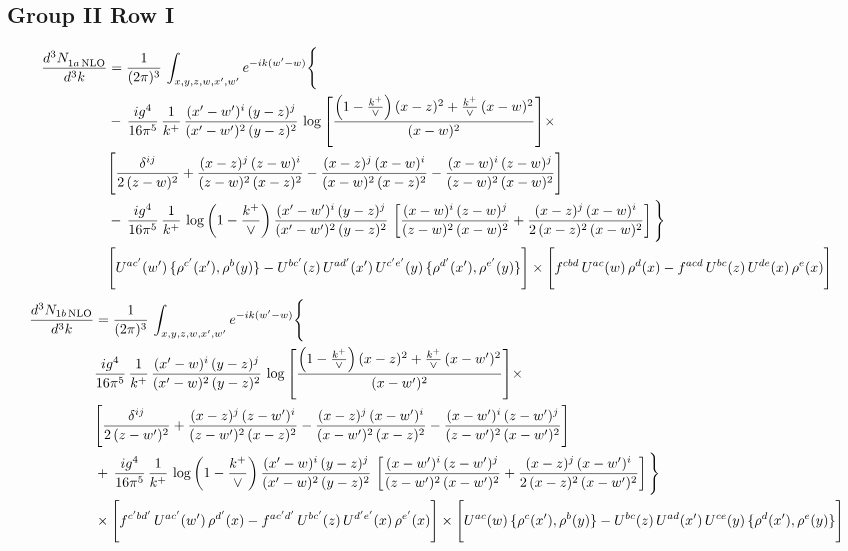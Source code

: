 \documentclass[10pt]{article}
\numberwithin{equation}{section}
\begin{document}
\subsection{Group II Row I}\label{sub:G2I}
\begin{align}
 \frac{d^{3}N_{1a\,\rm NLO}^{\rm}}{d^{3}k}  & =     \frac{1}{(2\pi)^{3}}\,\int_{x,y,z,w,x',w^{\prime}} e^{-ik(w^{\prime}-w)}\Bigg\{\notag \\
& -\, \frac{ig^{4}}{16\pi^{5}}\,\frac{1}{k^{+}}\, \frac{(x'-w')^{i}\,(y-z)^{j}}{(x'-w')^{2}\,(y-z)^{2}}\,\log{\left[\frac{\left(1-\frac{k^{+}}{\vee}\right)(x-z)^{2}+\frac{k^{+}}{\vee}\,(x-w)^{2}}{(x-w)^{2}}\right]}\times\notag \\ &  \Bigg[\frac{\delta^{ij}}{2\,(z-w)^{2}}+\frac{(x-z)^{j}\,(z-w)^{i}}{(z-w)^{2}\,(x-z)^{2}}-\frac{(x-z)^{j}\,(x-w)^{i}}{(x-w)^{2}\,(x-z)^{2}}-\frac{(x-w)^{i}\,(z-w)^{j}}{(z-w)^{2}\,(x-w)^{2}}\Bigg] \notag \\
& -\, \frac{ig^{4}}{16\pi^{5}}\,\frac{1}{k^{+}}\,\log{\left(1-\frac{k^{+}}{\vee}\right)}\,\frac{(x'-w')^{i}\,(y-z)^{j}}{(x'-w')^{2}\,(y-z)^{2}}\,\left[\frac{(x-w)^{i}\,(z-w)^{j}}{(z-w)^{2}\,(x-w)^{2}}+\frac{(x-z)^{j}\,(x-w)^{i}}{2\,(x-z)^{2}\, (x-w)^{2}}\right]\Bigg\} \notag \\ & \Bigg[U^{ac'}(w')\,\{\rho^{c'}(x'),\rho^{b}(y)\}-U^{bc'}(z)\,U^{ad'}(x')\,U^{c'e'}(y)\, \{\rho^{d'}(x'),\rho^{e'}(y)\}\Bigg]\times \Bigg[f^{cbd}\,U^{ac}(w)\,\rho^{d}(x)-f^{acd}\, U^{bc}(z)\,U^{de}(x)\,\rho^{e}(x)\Bigg]
\end{align}
\begin{align}
\frac{d^{3}N_{1b\, \rm NLO}}{d^{3}k} & =  \frac{1}{(2\pi)^{3}}\,\int_{x,y,z,w,x',w^{\prime}} e^{-ik(w^{\prime}-w)}\Bigg\{\notag \\
&  \frac{ig^{4}}{16\pi^{5}}\,\frac{1}{k^{+}}\, \frac{(x'-w)^{i}\,(y-z)^{j}}{(x'-w)^{2}\,(y-z)^{2}}\,\log{\left[\frac{\left(1-\frac{k^{+}}{\vee}\right)(x-z)^{2}+\frac{k^{+}}{\vee}\,(x-w')^{2}}{(x-w')^{2}}\right]}\times\notag \\ &  \Bigg[\frac{\delta^{ij}}{2\,(z-w')^{2}}+\frac{(x-z)^{j}\,(z-w')^{i}}{(z-w')^{2}\,(x-z)^{2}}-\frac{(x-z)^{j}\,(x-w')^{i}}{(x-w')^{2}\,(x-z)^{2}}-\frac{(x-w')^{i}\,(z-w')^{j}}{(z-w')^{2}\,(x-w')^{2}}\Bigg] \notag \\
& +\,\frac{ig^{4}}{16\pi^{5}}\,\frac{1}{k^{+}}\,\log{\left(1-\frac{k^{+}}{\vee}\right)}\,\frac{(x'-w)^{i}\,(y-z)^{j}}{(x'-w)^{2}\,(y-z)^{2}}\,\left[\frac{(x-w')^{i}\,(z-w')^{j}}{(z-w')^{2}\,(x-w')^{2}}+\frac{(x-z)^{j}\,(x-w')^{i}}{2\,(x-z)^{2}\, (x-w')^{2}}\right]\Bigg\} \notag \\ & \times\Bigg[f^{c'bd'}\,U^{ac'}(w')\,\rho^{d'}(x)-f^{ac'd'}\, U^{bc'}(z)\,U^{d'e'}(x)\,\rho^{e'}(x)\Bigg] \times \Bigg[U^{ac}(w)\,\{\rho^{c}(x'),\rho^{b}(y)\}-U^{bc}(z)\,U^{ad}(x')\,U^{ce}(y)\, \{\rho^{d}(x'),\rho^{e}(y)\}\Bigg]
\end{align}
\end{document}
